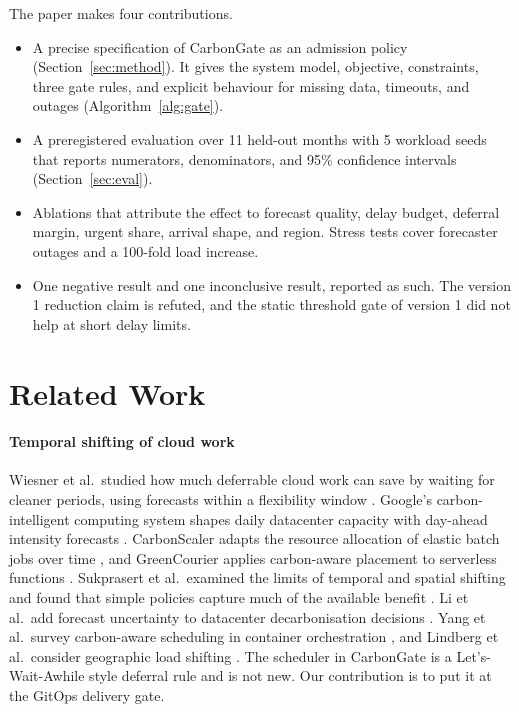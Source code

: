 \documentclass[journal]{IEEEtran}
\begin{document}
The paper makes four contributions.
\begin{itemize}
\item A precise specification of CarbonGate as an admission policy (Section~\ref{sec:method}). It gives the system model, objective, constraints, three gate rules, and explicit behaviour for missing data, timeouts, and outages (Algorithm~\ref{alg:gate}).
\item A preregistered evaluation over 11 held-out months with 5 workload seeds that reports numerators, denominators, and 95\% confidence intervals (Section~\ref{sec:eval}).
\item Ablations that attribute the effect to forecast quality, delay budget, deferral margin, urgent share, arrival shape, and region. Stress tests cover forecaster outages and a 100-fold load increase.
\item One negative result and one inconclusive result, reported as such. The version 1 reduction claim is refuted, and the static threshold gate of version 1 did not help at short delay limits.
\end{itemize}

\section{Related Work}
\label{sec:related}
\paragraph{Temporal shifting of cloud work} Wiesner et al.\ studied how much deferrable cloud work can save by waiting for cleaner periods, using forecasts within a flexibility window \cite{wiesner2021let}. Google's carbon-intelligent computing system shapes daily datacenter capacity with day-ahead intensity forecasts \cite{radovanovic2023carbon}. CarbonScaler adapts the resource allocation of elastic batch jobs over time \cite{hanafy2023carbonscaler}, and GreenCourier applies carbon-aware placement to serverless functions \cite{chadha2023greencourier}. Sukprasert et al.\ examined the limits of temporal and spatial shifting and found that simple policies capture much of the available benefit \cite{sukprasert2024limitations}. Li et al.\ add forecast uncertainty to datacenter decarbonisation decisions \cite{li2024uncertainty}. Yang et al.\ survey carbon-aware scheduling in container orchestration \cite{yang2025survey}, and Lindberg et al.\ consider geographic load shifting \cite{lindberg2022using}. The scheduler in CarbonGate is a Let's-Wait-Awhile style deferral rule and is not new. Our contribution is to put it at the GitOps delivery gate.
\end{document}
